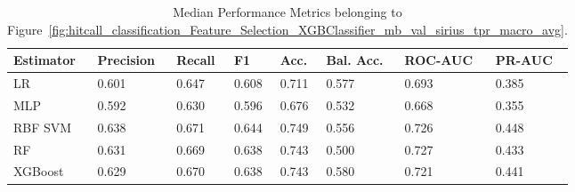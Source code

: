 \begin{longtable}{llllllll}
\caption{Median Performance Metrics belonging to Figure~\ref{fig:hitcall_classification_Feature_Selection_XGBClassifier_mb_val_sirius_tpr_macro_avg}.}\label{tab:table:hitcall_classification_feature_selection_xgbclassifier_mb_val_sirius_tpr_macro_avg}\\
\toprule
\midrule
\small Estimator & \small Precision & \small Recall & \small F1 & \small Acc. & \small Bal. Acc. & \small ROC-AUC & \small PR-AUC\\
\hline
LR & 0.601 & 0.647 & 0.608 & 0.711 & 0.577 & 0.693 & 0.385\\
MLP & 0.592 & 0.630 & 0.596 & 0.676 & 0.532 & 0.668 & 0.355\\
RBF SVM & 0.638 & 0.671 & 0.644 & 0.749 & 0.556 & 0.726 & 0.448\\
RF & 0.631 & 0.669 & 0.638 & 0.743 & 0.500 & 0.727 & 0.433\\
XGBoost & 0.629 & 0.670 & 0.638 & 0.743 & 0.580 & 0.721 & 0.441\\
\bottomrule
\end{longtable}